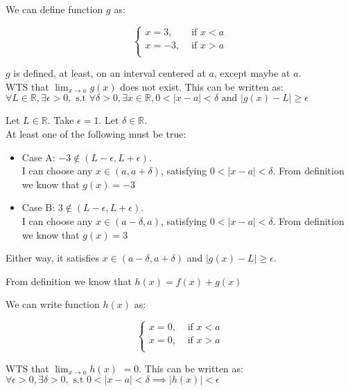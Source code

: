 \documentclass[12pt]{exam}
\newcommand {\DS} [1] {${\displaystyle #1}$}
\newcommand{\vv}{\vspace{.2cm}}
\newcommand{\R}{\mathbb{R}}
\begin{document}
\begin{enumerate}
We can define function $g$ as: 

$$
\begin{cases}
	x = 3, &\text{ if }x < a\\
	x = -3, &\text{ if } x > a\\
\end{cases}
$$

$g$ is defined, at least, on an interval centered at $a$, except maybe at $a$.\\

WTS that \DS{\lim_{x \to a} g(x)} does not exist.
This can be written as: $\forall L \in \R, \exists \epsilon > 0, \mbox{ s.t } \forall \delta > 0, \exists x \in \R,
 0 < |x - a| < \delta \mbox{ and } |g(x) - L| \geq \epsilon$

Let $L \in \R$. Take $\epsilon = 1$. Let $\delta \in \R$. \\
At least one of the following must be true:

\begin{itemize}
	\item Case A: $-3 \notin (L - \epsilon, L + \epsilon).$ \\ 
	I can choose any $x \in (a, a + \delta)$, satisfying $0 < |x - a| < \delta$. 
	From definition we know that $g(x) = -3$
\end{itemize}

\begin{itemize}
	\item Case B: $3 \notin (L - \epsilon, L + \epsilon).$ \\ 
	I can choose any $x \in (a - \delta, a )$, satisfying $0 < |x - a| < \delta$. 
	From definition we know that $g(x) = 3$
\end{itemize}

Either way, it satisfies $x \in (a - \delta, a + \delta)$ and $|g(x) - L| \geq \epsilon$. \\

\vv

From definition we know that $h(x) = f(x) + g(x)$

We can write function $h(x)$ as:

$$
\begin{cases}
	x = 0, &\text{ if }x < a\\
	x = 0, &\text{ if } x > a\\
\end{cases}
$$

WTS that \DS{\lim_{x \to a} h(x)} $= 0$. This can be written as: $\forall \epsilon > 0, \exists \delta > 0, \mbox{ s.t }
 0 < |x - a| < \delta \implies |h(x)| < \epsilon$
 

\end{enumerate}
\end{document}

